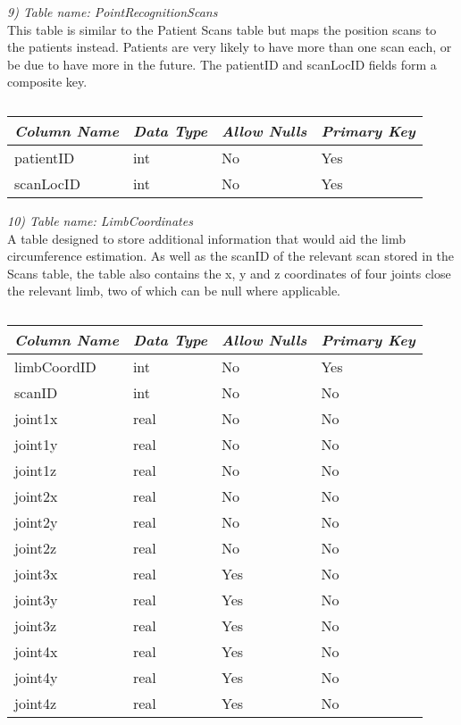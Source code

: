 \emph{9) Table name: PointRecognitionScans}\\

This table is similar to the Patient Scans table but maps the position scans to the patients instead. Patients are very likely to have more than one scan each, or be due to have more in the future. The patientID and scanLocID fields form a composite key.\\

\begin{table}[ht]
\centering
\begin{tabular}{| l | l | l | l |}
\hline
\emph{\bf{Column Name}} & \emph{\bf{Data Type}} & \emph{\bf{Allow Nulls}} & \emph{\bf{Primary Key}} \\\hline \hline
patientID & int & No & Yes \\\hline
scanLocID & int & No & Yes \\\hline
\end{tabular}
\label{table:pointRecognitionScans}
\caption[Database: PointRecognitionScans]{}
\end{table}

\emph{10) Table name: LimbCoordinates}\\

A table designed to store additional information that would aid the limb circumference estimation. As well as the scanID of the relevant scan stored in the Scans table, the table also contains the x, y and z coordinates of four joints close the relevant limb, two of which can be null where applicable.\\

\begin{table}[ht]
\centering
\begin{tabular}{| l | l | l | l |}
\hline
\emph{\bf{Column Name}} & \emph{\bf{Data Type}} & \emph{\bf{Allow Nulls}} & \emph{\bf{Primary Key}} \\\hline \hline
limbCoordID & int & No & Yes \\\hline
scanID & int & No & No \\\hline
joint1x & real & No & No \\\hline
joint1y & real & No & No \\\hline
joint1z & real & No & No \\\hline
joint2x & real & No & No \\\hline
joint2y & real & No & No \\\hline
joint2z & real & No & No \\\hline
joint3x & real & Yes & No \\\hline
joint3y & real & Yes & No \\\hline
joint3z & real & Yes & No \\\hline
joint4x & real & Yes & No \\\hline
joint4y & real & Yes & No \\\hline
joint4z & real & Yes & No \\\hline
\end{tabular}
\label{table:limbCoordinates}
\caption[Database: LimbCoordinates]{}
\end{table}

